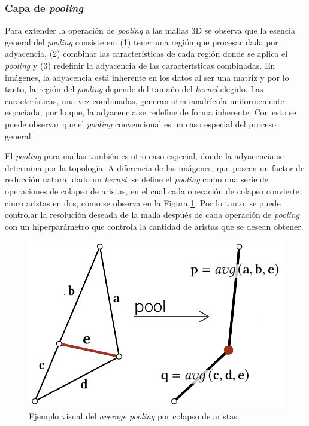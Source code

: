 \subsubsection{Capa de \textit{pooling}}
\label{section:meshcnnPooling}
Para extender la operación de \textit{pooling} a las mallas 3D se observa que la esencia general del \textit{pooling} consiste en: (1) tener una región que procesar dada por adyacencia, (2) combinar las características de cada región donde se aplica el \textit{pooling} y (3) redefinir la adyacencia de las características combinadas. En imágenes, la adyacencia está inherente en los datos al ser una matriz y por lo tanto, la región del \textit{pooling} depende del tamaño del \textit{kernel} elegido. Las características, una vez combinadas, generan otra cuadrícula uniformemente espaciada, por lo que, la adyacencia se redefine de forma inherente. Con esto se puede observar que el \textit{pooling} convencional es un caso especial del proceso general.

El \textit{pooling} para mallas también es otro caso especial, donde la adyacencia se determina por la topología. A diferencia de las imágenes, que poseen un factor de reducción natural dado un \textit{kernel}, se define el \textit{pooling} como una serie de operaciones de colapso de aristas, en el cual cada operación de colapso convierte cinco aristas en dos, como se observa en la Figura \ref{fig:mesh_pool}. Por lo tanto, se puede controlar la resolución deseada de la malla después de cada operación de \textit{pooling} con un hiperparámetro que controla la cantidad de aristas que se desean obtener.

\begin{figure}[h]
    \centering
    \includegraphics[width=0.6\linewidth]{imagenes/methods/mesh_pool_unpool.png}
    \caption[MeshCNN: Ejemplo visual de pooling]{Ejemplo visual del \textit{average pooling} por colapso de aristas.}
    \label{fig:mesh_pool}
\end{figure}

